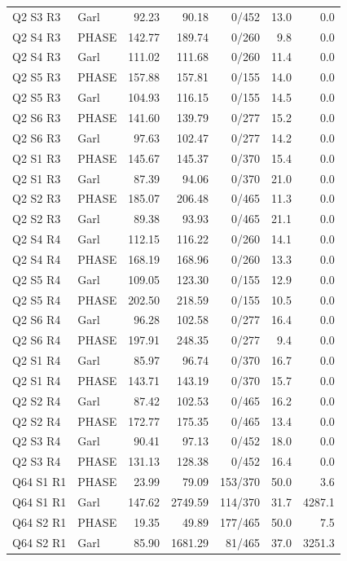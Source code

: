 \begin{longtable}{llrrrrr}
Q2 S3 R3 & Garl & 92.23 & 90.18 & 0/452 & 13.0 & 0.0 \\
Q2 S4 R3 & PHASE & 142.77 & 189.74 & 0/260 & 9.8 & 0.0 \\
Q2 S4 R3 & Garl & 111.02 & 111.68 & 0/260 & 11.4 & 0.0 \\
Q2 S5 R3 & PHASE & 157.88 & 157.81 & 0/155 & 14.0 & 0.0 \\
Q2 S5 R3 & Garl & 104.93 & 116.15 & 0/155 & 14.5 & 0.0 \\
Q2 S6 R3 & PHASE & 141.60 & 139.79 & 0/277 & 15.2 & 0.0 \\
Q2 S6 R3 & Garl & 97.63 & 102.47 & 0/277 & 14.2 & 0.0 \\
Q2 S1 R3 & PHASE & 145.67 & 145.37 & 0/370 & 15.4 & 0.0 \\
Q2 S1 R3 & Garl & 87.39 & 94.06 & 0/370 & 21.0 & 0.0 \\
Q2 S2 R3 & PHASE & 185.07 & 206.48 & 0/465 & 11.3 & 0.0 \\
Q2 S2 R3 & Garl & 89.38 & 93.93 & 0/465 & 21.1 & 0.0 \\
Q2 S4 R4 & Garl & 112.15 & 116.22 & 0/260 & 14.1 & 0.0 \\
Q2 S4 R4 & PHASE & 168.19 & 168.96 & 0/260 & 13.3 & 0.0 \\
Q2 S5 R4 & Garl & 109.05 & 123.30 & 0/155 & 12.9 & 0.0 \\
Q2 S5 R4 & PHASE & 202.50 & 218.59 & 0/155 & 10.5 & 0.0 \\
Q2 S6 R4 & Garl & 96.28 & 102.58 & 0/277 & 16.4 & 0.0 \\
Q2 S6 R4 & PHASE & 197.91 & 248.35 & 0/277 & 9.4 & 0.0 \\
Q2 S1 R4 & Garl & 85.97 & 96.74 & 0/370 & 16.7 & 0.0 \\
Q2 S1 R4 & PHASE & 143.71 & 143.19 & 0/370 & 15.7 & 0.0 \\
Q2 S2 R4 & Garl & 87.42 & 102.53 & 0/465 & 16.2 & 0.0 \\
Q2 S2 R4 & PHASE & 172.77 & 175.35 & 0/465 & 13.4 & 0.0 \\
Q2 S3 R4 & Garl & 90.41 & 97.13 & 0/452 & 18.0 & 0.0 \\
Q2 S3 R4 & PHASE & 131.13 & 128.38 & 0/452 & 16.4 & 0.0 \\
Q64 S1 R1 & PHASE & 23.99 & 79.09 & 153/370 & 50.0 & 3.6 \\
Q64 S1 R1 & Garl & 147.62 & 2749.59 & 114/370 & 31.7 & 4287.1 \\
Q64 S2 R1 & PHASE & 19.35 & 49.89 & 177/465 & 50.0 & 7.5 \\
Q64 S2 R1 & Garl & 85.90 & 1681.29 & 81/465 & 37.0 & 3251.3 \\

\end{longtable}
